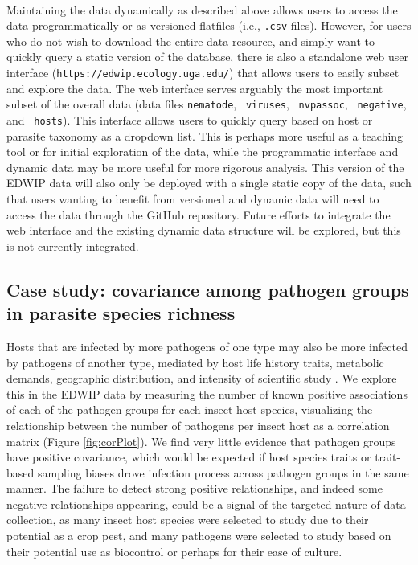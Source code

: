 \documentclass[12pt]{article}
\begin{document}
\paragraph*{}
Maintaining the data dynamically as described above allows users to access the data programmatically or as versioned flatfiles (i.e., \texttt{.csv} files). However, for users who do not wish to download the entire data resource, and simply want to quickly query a static version of the database, there is also a standalone web user interface (\texttt{https://edwip.ecology.uga.edu/}) that allows users to easily subset and explore the data. The web interface serves arguably the most important subset of the overall data (data files \texttt{nematode}, \ \texttt{viruses}, \ \texttt{nvpassoc}, \ \texttt{negative}, and \ \texttt{hosts}). This interface allows users to quickly query based on host or parasite taxonomy as a dropdown list. This is perhaps more useful as a teaching tool or for initial exploration of the data, while the programmatic interface and dynamic data may be more useful for more rigorous analysis. This version of the EDWIP data will also only be deployed with a single static copy of the data, such that users wanting to benefit from versioned and dynamic data will need to access the data through the GitHub repository. Future efforts to integrate the web interface and the existing dynamic data structure will be explored, but this is not currently integrated. 








\subsection*{Case study: covariance among pathogen groups in parasite species richness }

Hosts that are infected by more pathogens of one type may also be more infected by pathogens of another type, mediated by host life history traits, metabolic demands, geographic distribution, and intensity of scientific study \citep{dallas2021}. We explore this in the EDWIP data by measuring the number of known positive associations of each of the pathogen groups for each insect host species, visualizing the relationship between the number of pathogens per insect host as a correlation matrix (Figure \ref{fig:corPlot}). We find very little evidence that pathogen groups have positive covariance, which would be expected if host species traits or trait-based sampling biases drove infection process across pathogen groups in the same manner. The failure to detect strong positive relationships, and indeed some negative relationships appearing, could be a signal of the targeted nature of data collection, as many insect host species were selected to study due to their potential as a crop pest, and many pathogens were selected to study based on their potential use as biocontrol or perhaps for their ease of culture. 
\end{document}
